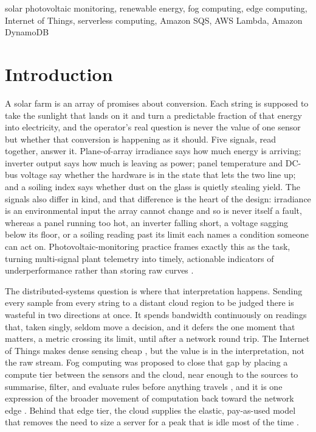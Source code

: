 \documentclass[conference]{IEEEtran}
\begin{document}
\begin{IEEEkeywords}
solar photovoltaic monitoring, renewable energy, fog computing, edge computing, Internet of Things, serverless computing, Amazon SQS, AWS Lambda, Amazon DynamoDB
\end{IEEEkeywords}

\section{Introduction}

A solar farm is an array of promises about conversion. Each string is supposed to take the sunlight that lands on it and turn a predictable fraction of that energy into electricity, and the operator's real question is never the value of one sensor but whether that conversion is happening as it should. Five signals, read together, answer it. Plane-of-array irradiance says how much energy is arriving; inverter output says how much is leaving as power; panel temperature and DC-bus voltage say whether the hardware is in the state that lets the two line up; and a soiling index says whether dust on the glass is quietly stealing yield. The signals also differ in kind, and that difference is the heart of the design: irradiance is an environmental input the array cannot change and so is never itself a fault, whereas a panel running too hot, an inverter falling short, a voltage sagging below its floor, or a soiling reading past its limit each names a condition someone can act on. Photovoltaic-monitoring practice frames exactly this as the task, turning multi-signal plant telemetry into timely, actionable indicators of underperformance rather than storing raw curves \cite{madeti2017, woyte2014}.

The distributed-systems question is where that interpretation happens. Sending every sample from every string to a distant cloud region to be judged there is wasteful in two directions at once. It spends bandwidth continuously on readings that, taken singly, seldom move a decision, and it defers the one moment that matters, a metric crossing its limit, until after a network round trip. The Internet of Things makes dense sensing cheap \cite{atzori2010}, but the value is in the interpretation, not the raw stream. Fog computing was proposed to close that gap by placing a compute tier between the sensors and the cloud, near enough to the sources to summarise, filter, and evaluate rules before anything travels \cite{bonomi2012, yousefpour2019}, and it is one expression of the broader movement of computation back toward the network edge \cite{shi2016, satyanarayanan2017}. Behind that edge tier, the cloud supplies the elastic, pay-as-used model that removes the need to size a server for a peak that is idle most of the time \cite{armbrust2010}.
\end{document}
